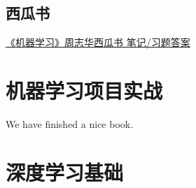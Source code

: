 \documentclass[
]{book}
\begin{document}
\hypertarget{ux897fux74dcux4e66}{%
\section{西瓜书}\label{ux897fux74dcux4e66}}

\href{https://mp.weixin.qq.com/s?__biz=MzA4MjYwMTc5Nw==\&mid=2648931766\&idx=1\&sn=8d819ff1d7b2aa9499ef71e906dc129f\&chksm=8794ef9cb0e3668a85bfa725c77b7ca93aa586863b6acf07a37effcb13c1970f67be800fbabd\&token=2004915986\&lang=en_US\#rd}{《机器学习》周志华西瓜书 笔记/习题答案}

\hypertarget{ux673aux5668ux5b66ux4e60ux9879ux76eeux5b9eux6218}{%
\chapter{机器学习项目实战}\label{ux673aux5668ux5b66ux4e60ux9879ux76eeux5b9eux6218}}

We have finished a nice book.

\hypertarget{ux6df1ux5ea6ux5b66ux4e60ux57faux7840}{%
\chapter{深度学习基础}\label{ux6df1ux5ea6ux5b66ux4e60ux57faux7840}}
\end{document}
